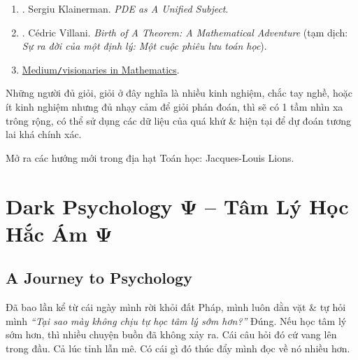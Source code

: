 \documentclass[12pt,twoside]{book}
\begin{document}
\begin{enumerate}
	\item \cite{Klainerman2000}. {\sc Sergiu Klainerman}. {\it PDE as A Unified Subject}.
	\item \cite{Villani2015}. {\sc C\'edric Villani}. {\it Birth  of A Theorem: A Mathematical Adventure} (tạm dịch: {\it Sự ra đời của một định lý: Một cuộc phiêu lưu toán học}).
	\item \href{https://medium.com/science-uncovered/visionaries-in-mathematics-a45138a76486}{Medium{\tt/}visionaries in Mathematics}.
\end{enumerate}
Những người đủ giỏi, giỏi ở đây nghĩa là nhiều kinh nghiệm, chắc tay nghề, hoặc ít kinh nghiệm nhưng đủ nhạy cảm để giỏi phán đoán, thì sẽ có 1 tầm nhìn xa trông rộng, có thể sử dụng các dữ liệu của quá khứ \& hiện tại để dự đoán tương lai khá chính xác.

Mở ra các hướng mới trong địa hạt Toán học: {\sc Jacques-Louis Lions}.


\chapter{Dark Psychology $\boldsymbol{\Psi}$ -- Tâm Lý Học Hắc Ám $\boldsymbol{\Psi}$}
\minitoc

\section{A Journey to Psychology}
Đã bao lần kể từ cái ngày mình rời khỏi đất Pháp, mình luôn dằn vặt \& tự hỏi mình {\it ``Tại sao mày không chịu tự học tâm lý sớm hơn?''} Đúng. Nếu học tâm lý sớm hơn, thì nhiều chuyện buồn đã không xảy ra. Cái câu hỏi đó cứ vang lên trong đầu. Cả lúc tỉnh lẫn mê. Có cái gì đó thúc đẩy mình đọc về nó nhiều hơn.
\end{document}
